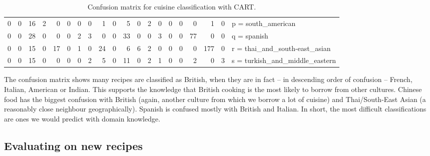 \documentclass[11pt,a4paper]{article}
\begin{document}
\begin{sidewaystable}
\begin{tabular}{r r r r r r r r r r r r r r r r r r r | l}
    0&   0&  16&   2&   0&   0&   0&   0&   1&   0&   5&   0&   2&   0&   0&   0&   0&   1&   0& p = south\_american \\
    0&   0&  28&   0&   0&   0&   2&   3&   0&   0&  33&   0&   0&   3&   0&   0&  77&   0&   0& q = spanish \\
    0&   0&  15&   0&  17&   0&   1&   0&  24&   0&   6&   6&   2&   0&   0&   0&   0& 177&   0& r = thai\_and\_south-east\_asian \\
    0&   0&  15&   0&   0&   0&   0&   2&   5&   0&  11&   0&   2&   1&   0&   0&   2&   0&   3& s = turkish\_and\_middle\_eastern \\
  \end{tabular}
  \caption{Confusion matrix for cuisine classification with CART.}
  \label{tab:confusion}
\end{sidewaystable}

The confusion matrix shows many recipes are classified as British, when they are in
fact -- in descending order of confusion -- French, Italian, American or Indian. This
supports the knowledge that British cooking is the most likely to borrow
from other cultures. Chinese food has the biggest confusion with British (again,
another culture from which we borrow a lot of cuisine) and Thai/South-East Asian (a
reasonably close neighbour geographically). Spanish is confused mostly with British
and Italian. In short, the most difficult classifications are ones we would predict
with domain knowledge.

\subsection{Evaluating on new recipes}
\end{document}

